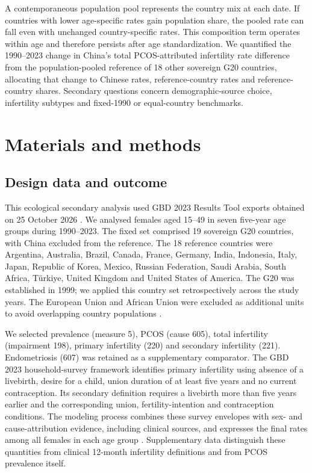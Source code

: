 \documentclass[11pt,a4paper]{article}
\begin{document}
A contemporaneous population pool represents the country mix at each date. If countries with lower age-specific rates gain population share, the pooled rate can fall even with unchanged country-specific rates. This composition term operates within age and therefore persists after age standardization. We quantified the 1990--2023 change in China's total PCOS-attributed infertility rate difference from the population-pooled reference of 18 other sovereign G20 countries, allocating that change to Chinese rates, reference-country rates and reference-country shares. Secondary questions concern demographic-source choice, infertility subtypes and fixed-1990 or equal-country benchmarks.

\section{Materials and methods}
\subsection{Design data and outcome}
This ecological secondary analysis used GBD 2023 Results Tool exports obtained on 25 October 2026 \citep{results}. We analysed females aged 15--49 in seven five-year age groups during 1990--2023. The fixed set comprised 19 sovereign G20 countries, with China excluded from the reference. The 18 reference countries were Argentina, Australia, Brazil, Canada, France, Germany, India, Indonesia, Italy, Japan, Republic of Korea, Mexico, Russian Federation, Saudi Arabia, South Africa, T\"urkiye, United Kingdom and United States of America. The G20 was established in 1999; we applied this country set retrospectively across the study years. The European Union and African Union were excluded as additional units to avoid overlapping country populations \citep{g20}.

We selected prevalence (measure 5), PCOS (cause 605), total infertility (impairment 198), primary infertility (220) and secondary infertility (221). Endometriosis (607) was retained as a supplementary comparator. The GBD 2023 household-survey framework identifies primary infertility using absence of a livebirth, desire for a child, union duration of at least five years and no current contraception. Its secondary definition requires a livebirth more than five years earlier and the corresponding union, fertility-intention and contraception conditions. The modeling process combines these survey envelopes with sex- and cause-attribution evidence, including clinical sources, and expresses the final rates among all females in each age group \citep{gbd}. Supplementary data distinguish these quantities from clinical 12-month infertility definitions and from PCOS prevalence itself.
\end{document}
